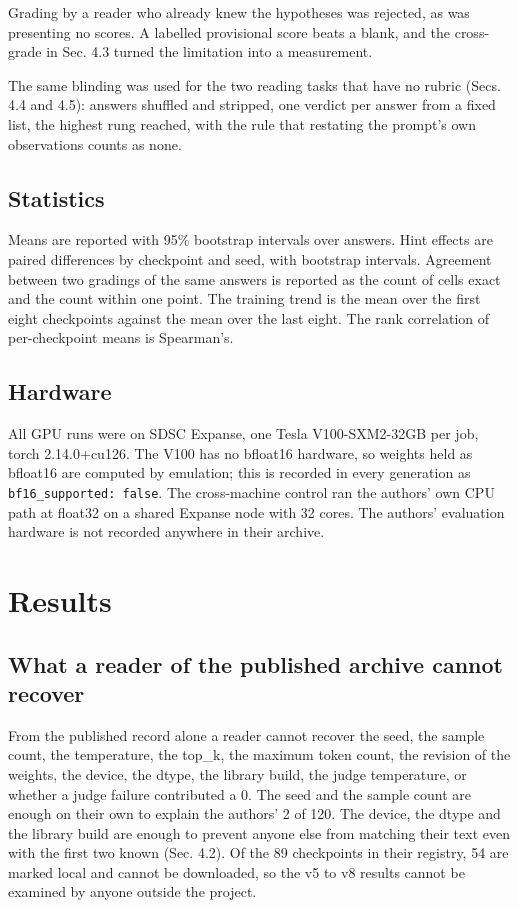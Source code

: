 \documentclass[reprint,prx,amsmath,amssymb,aps,superscriptaddress]{revtex4-2}
\begin{document}
Grading by a reader who already knew the hypotheses was rejected, as was presenting no scores. A labelled provisional score beats a blank, and the cross-grade in Sec. 4.3 turned the limitation into a measurement.

The same blinding was used for the two reading tasks that have no rubric (Secs. 4.4 and 4.5): answers shuffled and stripped, one verdict per answer from a fixed list, the highest rung reached, with the rule that restating the prompt's own observations counts as none.

\subsection{Statistics}

Means are reported with 95\% bootstrap intervals over answers. Hint effects are paired differences by checkpoint and seed, with bootstrap intervals. Agreement between two gradings of the same answers is reported as the count of cells exact and the count within one point. The training trend is the mean over the first eight checkpoints against the mean over the last eight. The rank correlation of per-checkpoint means is Spearman's.

\subsection{Hardware}

All GPU runs were on SDSC Expanse, one Tesla V100-SXM2-32GB per job, torch 2.14.0+cu126. The V100 has no bfloat16 hardware, so weights held as bfloat16 are computed by emulation; this is recorded in every generation as \texttt{bf16\_supported: false}. The cross-machine control ran the authors' own CPU path at float32 on a shared Expanse node with 32 cores. The authors' evaluation hardware is not recorded anywhere in their archive.

\section{Results}

\subsection{What a reader of the published archive cannot recover}

From the published record alone a reader cannot recover the seed, the sample count, the temperature, the top\_k, the maximum token count, the revision of the weights, the device, the dtype, the library build, the judge temperature, or whether a judge failure contributed a 0. The seed and the sample count are enough on their own to explain the authors' 2 of 120. The device, the dtype and the library build are enough to prevent anyone else from matching their text even with the first two known (Sec. 4.2). Of the 89 checkpoints in their registry, 54 are marked local and cannot be downloaded, so the v5 to v8 results cannot be examined by anyone outside the project.
\end{document}
